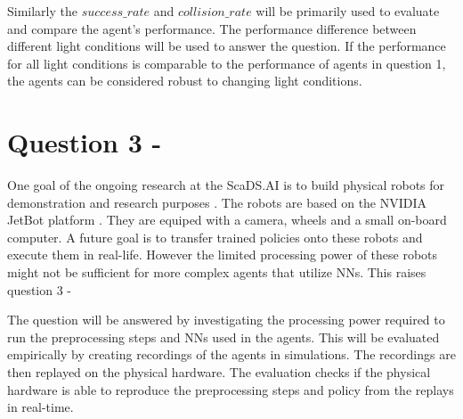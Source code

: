 Similarly the $success\_rate$ and $collision\_rate$ will be primarily used to evaluate and compare the agent's performance. The performance difference between different light conditions will be used to answer the question. If the performance for all light conditions is comparable to the performance of agents in question 1, the agents can be considered robust to changing light conditions.

\section{Question 3 - \questionThree}

One goal of the ongoing research at the ScaDS.AI is to build physical robots for demonstration and research purposes \textcite{merlin_flach}. The robots are based on the NVIDIA JetBot platform \autocite{jetbot}. They are equiped with a camera, wheels and a small on-board computer. A future goal is to transfer trained policies onto these robots and execute them in real-life. However the limited processing power of these robots might not be sufficient for more complex agents that utilize \acp{NN}. This raises question 3 - \questionThree


The question will be answered by investigating the processing power required to run the preprocessing steps and \acp{NN} used in the agents. This will be evaluated empirically by creating recordings of the agents in simulations. The recordings are then replayed on the physical hardware. The evaluation checks if the physical hardware is able to reproduce the preprocessing steps and policy from the replays in real-time.

